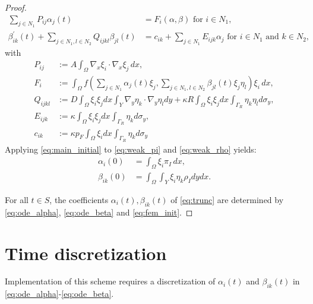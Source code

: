 \documentclass{article}
\begin{document}
\begin{proof}
    \begin{align}
        \sum_{j\in N_1} P_{ij} \alpha_j(t) &= F_i(\alpha,\beta)\label{eq:ode_alpha} \mbox{ for }i\in N_1,\\
        \beta^\prime_{ik}(t) + \sum_{j\in N_1,l\in N_2} Q_{ijkl} \beta_{jl}(t) &= c_{ik} + \sum_{j\in N_1} E_{ijk}\alpha_j\label{eq:ode_beta}\mbox{ for }i\in N_1\mbox{ and }k \in N_2,
    \end{align}
    with
    \begin{equation}
        \begin{split}
            P_{ij} &:= A \int_\Omega \nabla_x \xi_i \cdot \nabla_x \xi_j\,dx,\\
            F_i &:= \int_\Omega f \left( \sum_{j\in N_1}\alpha_j(t) \xi_j,\sum_{j\in N_1,l\in N_2}\beta_{jl}(t)\xi_j\eta_l \right)\xi_i\,dx,\\
            Q_{ijkl} &:= D \int_\Omega \xi_i\xi_jdx\int_{Y} \nabla_y \eta_k\cdot \nabla_y \eta_ldy + \kappa R\int_\Omega \xi_i\xi_j dx\int_{\Gamma_R}\eta_k \eta_ld\sigma_y,\\
            E_{ijk} &:= \kappa\int_\Omega\xi_i\xi_j dx\int_{\Gamma_R} \eta_kd\sigma_y,\\
            c_{ik}&:= \kappa p_F\int_\Omega \xi_i dx\int_{\Gamma_R} \eta_k d\sigma_y\,
        \end{split}
        \label{eq:matrices}
    \end{equation}
    Applying \eqref{eq:main_initial} to \eqref{eq:weak_pi} and \eqref{eq:weak_rho} yields:
    \begin{equation}
        \begin{split}
            \alpha_i(0) &= \int_\Omega \xi_i\pi_I\,dx,\\
            \beta_{ik}(0) &= \int_\Omega\int_Y\xi_i\eta_k\rho_Idydx.
        \end{split}
        \label{eq:fem_init}
    \end{equation}

    For all $t \in S$, the coefficients $\alpha_i(t), \beta_{ik}(t)$ of \eqref{eq:trunc} are determined by \eqref{eq:ode_alpha}, \eqref{eq:ode_beta} and \eqref{eq:fem_init}.
\end{proof}

\section{Time discretization}
\label{sec:time}
Implementation of this scheme requires a discretization of $\alpha_i(t)$ and $\beta_{ik}(t)$ in \eqref{eq:ode_alpha}-\eqref{eq:ode_beta}.
\end{document}
